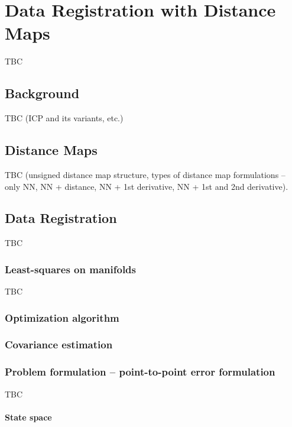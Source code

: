 \chapter{Data Registration with Distance Maps}\label{chap:distance-maps}

TBC

\section{Background}\label{sec:distance-maps:background}

TBC (ICP  and its variants, etc.)

\section{Distance Maps}\label{sec:distance-maps}

TBC (unsigned distance map structure,
types of distance map formulations -- only NN, NN + distance,
NN + 1st derivative, NN + 1st and 2nd derivative).

\section{Data Registration}\label{sec:distance-maps:data-registration}

TBC

\subsection{Least-squares on manifolds}

TBC

\subsection{Optimization algorithm}
\subsection{Covariance estimation}

\subsection{Problem formulation -- point-to-point error formulation}

TBC

\subsubsection{State space}
